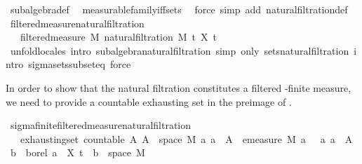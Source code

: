\begin{isabellebody}
\isamarkupfalse%
\ subalgebra{\isacharunderscore}{\kern0pt}def\ \isamarkupfalse%
\ measurable{\isacharunderscore}{\kern0pt}family{\isacharunderscore}{\kern0pt}iff{\isacharunderscore}{\kern0pt}sets\ \isamarkupfalse%
\ {\isacharparenleft}{\kern0pt}force\ simp\ add{\isacharcolon}{\kern0pt}\ natural{\isacharunderscore}{\kern0pt}filtration{\isacharunderscore}{\kern0pt}def{\isacharparenright}{\kern0pt}%
\endisatagproof
{\isafoldproof}%
%
\isadelimproof
\isanewline
%
\endisadelimproof
\isanewline
{}\isamarkupfalse%
\ filtered{\isacharunderscore}{\kern0pt}measure{\isacharunderscore}{\kern0pt}natural{\isacharunderscore}{\kern0pt}filtration{\isacharcolon}{\kern0pt}\ \isanewline
\ \ \ {\isachardoublequoteopen}filtered{\isacharunderscore}{\kern0pt}measure\ M\ {\isacharparenleft}{\kern0pt}natural{\isacharunderscore}{\kern0pt}filtration\ M\ t\ X{\isacharparenright}{\kern0pt}\ t\isanewline
%
\isadelimproof
\ \ \ \ %
\endisadelimproof
%
\isatagproof
{}\isamarkupfalse%
\ {\isacharparenleft}{\kern0pt}unfold{\isacharunderscore}{\kern0pt}locales{\isacharparenright}{\kern0pt}\ {\isacharparenleft}{\kern0pt}intro\ subalgebra{\isacharunderscore}{\kern0pt}natural{\isacharunderscore}{\kern0pt}filtration{\isacharcomma}{\kern0pt}\ simp\ only{\isacharcolon}{\kern0pt}\ sets{\isacharunderscore}{\kern0pt}natural{\isacharunderscore}{\kern0pt}filtration{\isacharcomma}{\kern0pt}\ intro\ sigma{\isacharunderscore}{\kern0pt}sets{\isacharunderscore}{\kern0pt}subseteq{\isacharcomma}{\kern0pt}\ force{\isacharparenright}{\kern0pt}%
\endisatagproof
{\isafoldproof}%
%
\isadelimproof
%
\endisadelimproof
%
\begin{isamarkuptext}%
In order to show that the natural filtration constitutes a filtered \isa{{\isasymsigma}}-finite measure, we need to provide a countable exhausting set in the preimage of .%
\end{isamarkuptext}\isamarkuptrue%
\isamarkupfalse%
\ sigma{\isacharunderscore}{\kern0pt}finite{\isacharunderscore}{\kern0pt}filtered{\isacharunderscore}{\kern0pt}measure{\isacharunderscore}{\kern0pt}natural{\isacharunderscore}{\kern0pt}filtration{\isacharcolon}{\kern0pt}\isanewline
\ \ \ exhausting{\isacharunderscore}{\kern0pt}set{\isacharcolon}{\kern0pt}\ {\isachardoublequoteopen}countable\ A{\isachardoublequoteclose}\ {\isachardoublequoteopen}{\isacharparenleft}{\kern0pt}{\isasymUnion}A{\isacharparenright}{\kern0pt}\ {\isacharequal}{\kern0pt}\ space\ M{\isachardoublequoteclose}\ {\isachardoublequoteopen}{\isasymAnd}a{\isachardot}{\kern0pt}\ a\ {\isasymin}\ A\ {\isasymLongrightarrow}\ emeasure\ M\ a\ {\isasymnoteq}\ {\isasyminfinity}{\isachardoublequoteclose}\ {\isachardoublequoteopen}{\isasymAnd}a{\isachardot}{\kern0pt}\ a\ {\isasymin}\ A\ {\isasymLongrightarrow}\ {\isasymexists}b\ {\isasymin}\ borel{\isachardot}{\kern0pt}\ a\ {\isacharequal}{\kern0pt}\ X\ t\ {\isacharminus}{\kern0pt}{\isacharbackquote}{\kern0pt}\ b\ {\isasyminter}\ space\ M{\isachardoublequoteclose}\isanewline

\end{isabellebody}
